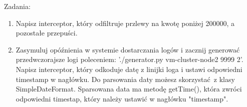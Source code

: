 \documentclass{article}
\begin{document}
\pagebreak

Zadania:
\begin{enumerate}
\item Napisz interceptor, który odfiltruje przlewy na kwotę poniżej 200000, a pozostałe przepuści.
\item Zasymuluj opóźnienia w systemie dostarczania logów i zacznij generować przedwczorajsze logi poleceniem: './generator.py vm-cluster-node2 9999 2'. Napisz interceptor, który odkoduje datę z linijki loga i ustawi odpowiedni timestamp w nagłówku. Do parsowania daty możesz skorzystać z klasy SimpleDateFormat. Sparsowana data ma metodę getTime(), która zwróci odpowiedni timestap, który należy ustawić w nagłówku "timestamp".
\end{enumerate}
\end{document}
